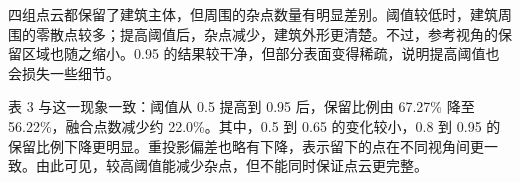 四组点云都保留了建筑主体，但周围的杂点数量有明显差别。阈值较低时，建筑周围的零散点较多；提高阈值后，杂点减少，建筑外形更清楚。不过，参考视角的保留区域也随之缩小。0.95 的结果较干净，但部分表面变得稀疏，说明提高阈值也会损失一些细节。

表 3 与这一现象一致：阈值从 0.5 提高到 0.95 后，保留比例由 67.27\% 降至 56.22\%，融合点数减少约 22.0\%。其中，0.5 到 0.65 的变化较小，0.8 到 0.95 的保留比例下降更明显。重投影偏差也略有下降，表示留下的点在不同视角间更一致。由此可见，较高阈值能减少杂点，但不能同时保证点云更完整。
